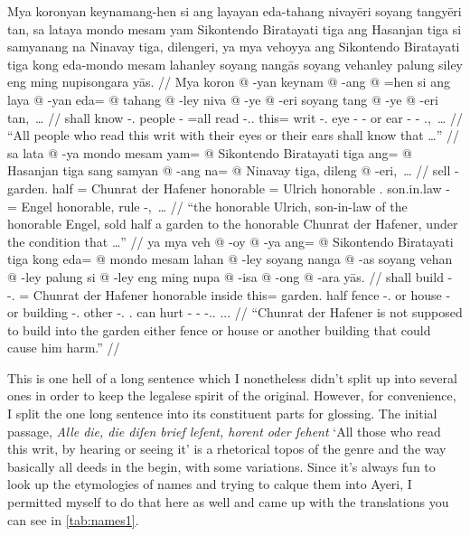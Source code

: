 \documentclass[12pt,paper=a4]{scrartcl}
\newcommand{\fw}[1]{\textit{#1}} %
\begin{document}
\pex
	\glpreamble Mya koronyan keynamang-hen si ang layayan eda-tahang 
		nivayēri soyang tangyēri tan, sa lataya mondo mesam yam 
		Sikontendo Biratayati tiga ang Hasanjan tiga si samyanang na 
		Nina\-vay tiga, dilengeri, ya mya vehoyya ang Sikontendo 
		Biratayati tiga kong eda-mondo mesam lahanley soyang nangās 
		soyang vehanley palung siley eng ming nupisongara yās. //
	\a \begingl
		\gla Mya koron @ -yan keynam @ -ang @ =hen si ang laya @ -yan 
		eda= @ tahang @ -ley niva @ -ye @ -eri soyang tang @ -ye @ -eri 
			tan,~… //
		\glb shall know -\Tpl{}.\M{} people -\Aarg{} =all \Rel{} 
			\AgtT{} read -\Tpl{}.\M{}.\Top{} this= writ 
			-\Parg{}.\Inan{} eye -\Pl{} -\Ins{} or ear -\Pl{} 
			-\Ins{} \Tpl{}.\Gen{},~… //
		\glft \enquote{All people who read this writ with their eyes or 
			their ears shall know that …} //
	\endgl
	\a \begingl
		\gla sa lata @ -ya mondo mesam yam= @ Sikontendo Biratayati tiga 
			ang= @ Hasanjan tiga sang samyan @ -ang na= @ Ninavay 
			tiga, dileng @ -eri,~… //
		\glb \PatT{} sell -\Tsg{} garden.\Top{} half \Dat{}= Chunrat 
			{der Hafener} honorable \Aarg{}= Ulrich honorable 
			\Rel{}.\Aarg{} son.in.law -\Aarg{} \Gen{}= Engel 
			honorable, rule -\Ins{},~… //
		\glft \enquote{the honorable Ulrich, son-in-law of the honorable 
			Engel, sold half a garden to the honorable Chunrat der 
			Hafener, under the condition that …} //
	\endgl
	\a \begingl
		\gla ya mya veh @ -oy @ -ya ang= @ Sikontendo Biratayati tiga 
			kong eda= @ mondo mesam lahan @ -ley soyang nanga @ -as 
			soyang vehan @ -ley palung si @ -ley eng ming nupa @ 
			-isa @ -ong @ -ara yās. //
		\glb \LocT{} shall build -\Neg{} -\Tsg{}.\M{} \Aarg{}= 
			Chunrat {der Hafener} honorable inside this= 
			garden.\Top{} half fence -\Parg{}.\Inan{} or house 
			-\Parg{} or building -\Parg{}.\Inan{} other \Rel{} 
			-\Parg{}.\Inan{} \AgtT{}.\Inan{} can hurt -\Caus{} 
			-\Irr{} -\Tsg{}.\Inan{}.\Top{} \Tsg{}.\M{}.\Parg{}. //
		\glft \enquote{Chunrat der Hafener is not supposed to build into 
		the garden either fence or house or another building that could 
		cause him harm.} //
	\endgl
\xe

This is one hell of a long sentence which I nonetheless didn't split up into 
several ones in order to keep the legalese spirit of the original. However, 
for convenience, I split the one long sentence into its constituent parts 
for glossing. The initial passage, \fw{Alle die, die diſen brief leſent, horent 
oder ſehent} `All those who read this writ, by hearing or seeing it' is a 
rhetorical topos of the genre and the way basically all deeds in the 
 begin, with some variations. Since it's always fun to look up 
the etymologies of names and trying to calque them into Ayeri, I permitted 
myself to do that here as well and came up with the translations you can see in 
\autoref{tab:names1}.
\end{document}
